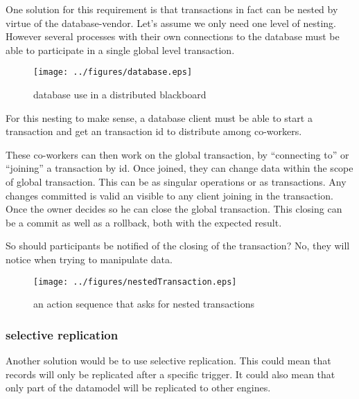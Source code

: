 \documentclass[]{lofar}
\begin{document}
        One solution for this requirement is that transactions in fact
        can be nested by virtue of the database-vendor. Let's assume
        we only need one level of nesting. However several processes
        with their own connections to the database must be able to
        participate in a single global level transaction.

        \begin{figure}
          \texttt{[image: ../figures/database.eps]}
          \hypertarget{fig:database}{}
          \caption{database use in a distributed blackboard\label{fig:database}}
        \end{figure}

        For this nesting to make sense, a database client must be able
        to start a transaction and get an transaction id to distribute
        among co-workers.

        These co-workers can then work on the global transaction, by
        ``connecting to'' or ``joining'' a transaction by id. Once joined,
        they can change data within the scope of global
        transaction. This can be as singular operations or as
        transactions. Any changes committed is valid an visible to any
        client joining in the transaction. Once the owner decides so
        he can close the global transaction. This closing can be a
        commit as well as a rollback, both with the expected result.
     
        So should participants be notified of the closing of the
        transaction?  No, they will notice when trying to manipulate
        data.

        \begin{figure}
          \texttt{[image: ../figures/nestedTransaction.eps]}
          \hypertarget{fig:nestedTransaction}{}
          \caption{an action sequence that asks for nested transactions\label{fig:nestedTransactions}}
        \end{figure}

      \subsubsection{selective replication}
      \label{subsubsec:selective-replication}\hypertarget{subsubsec:selective-replication}{}%

        Another solution would be to use selective replication. This
        could mean that records will only be replicated after a
        specific trigger. It could also mean that only part of the
        datamodel will be replicated to other engines.
\end{document}
